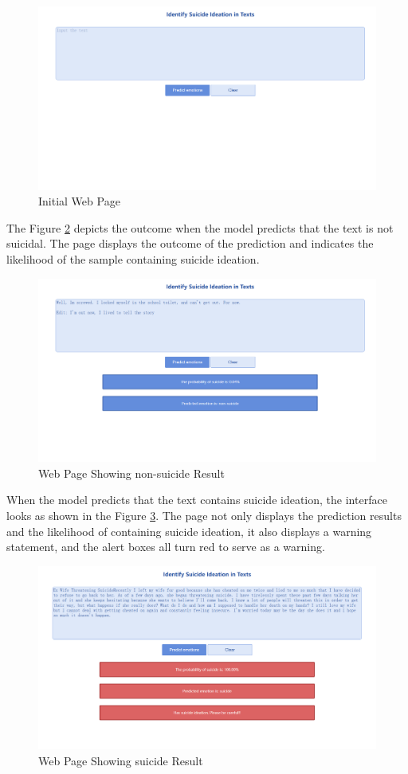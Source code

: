 \documentclass[ %
                    author={Bocheng Wang},
                supervisor={Dr. Qiang Liu},
                    degree={MSc},
                     title={A Research on Identification of Suicide Ideation in Texts with Multiple Models},
                      type={},
                      year={2024}]{dissertation}
\begin{document}
\begin{figure}[h]
      \centering
      \includegraphics[width=0.57\linewidth]{../img/page_initial.png}
      \caption{Initial Web Page}
      \label{fig:pageinitial}
\end{figure}

The Figure \ref{fig:pagenon} depicts the outcome when the model predicts that the text is not suicidal. The page displays the outcome of the prediction and indicates the likelihood of the sample containing suicide ideation.

\begin{figure}[h]
      \centering
      \includegraphics[width=0.57\linewidth]{../img/page_nonsuicide.png}
      \caption{Web Page Showing non-suicide Result}
      \label{fig:pagenon}
\end{figure}

When the model predicts that the text contains suicide ideation, the interface looks as shown in the Figure \ref{fig:pagesui}. The page not only displays the prediction results and the likelihood of containing suicide ideation, it also displays a warning statement, and the alert boxes all turn red to serve as a warning.

\begin{figure}[h]
      \centering
      \includegraphics[width=0.57\linewidth]{../img/page_suicide.png}
      \caption{Web Page Showing suicide Result}
      \label{fig:pagesui}
\end{figure}
\end{document}
